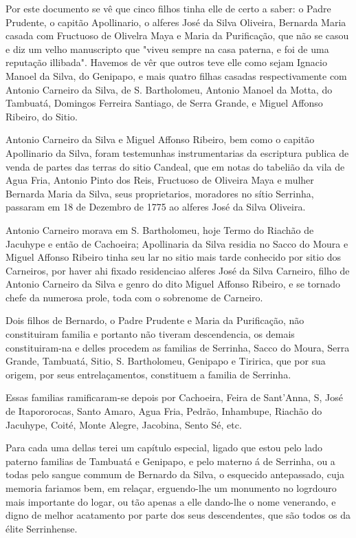 Por este documento se vê que cinco filhos tinha elle de certo a saber: o Padre Prudente, o capitão Apollinario, o alferes José da Silva Oliveira, Bernarda Maria casada com Fructuoso de Olivelra Maya e Maria da Purificação, que não se casou e diz um velho manuscripto que "viveu sempre na casa paterna, e foi de uma reputação illibada". Havemos de vêr que outros teve elle como sejam Ignacio Manoel da Silva, do Genipapo, e mais quatro filhas casadas respectivamente com Antonio Carneiro da Silva, de S. Bartholomeu, Antonio Manoel da Motta, do Tambuatá, Domingos  Ferreira Santiago, de Serra Grande, e Miguel Affonso Ribeiro, do Sitio.

Antonio Carneiro da Silva e Miguel Affonso Ribeiro, bem como o capitão Apollinario da Silva, foram testemunhas instrumentarias da escriptura publica de venda de partes das terras do sitio Candeal, que em notas do tabelião da vila de Agua Fria, Antonio Pinto dos Reis, Fructuoso de Oliveira Maya e mulher Bernarda Maria da Silva, seus proprietarios, moradores no sítio Serrinha, passaram em 18 de Dezembro de 1775 ao alferes José da Silva Oliveira.

Antonio Carneiro morava em S. Bartholomeu, hoje Termo do Riachão de Jacuhype e então de Cachoeira; Apollinaria da Silva residia no Sacco do Moura e Miguel Affonso Ribeiro tinha seu lar no sitio mais tarde conhecido por sitio dos Carneiros, por haver ahi fixado residenciao alferes José da Silva Carneiro, filho de Antonio Carneiro da Silva e genro do dito Miguel Affonso Ribeiro, e se tornado chefe da numerosa prole, toda com o sobrenome de Carneiro.

Dois filhos de Bernardo, o Padre Prudente e Maria da Purificação, não constituiram familia e portanto não tiveram descendencia, os demais constituiram-na e delles procedem as familias de Serrinha, Sacco do Moura, Serra Grande, Tambuatá, Sitio, S. Bartholomeu, Genipapo e Tiririca, que por sua origem, por seus entrelaçamentos, constituem a familia de Serrinha.

Essas familias ramificaram-se depois por Cachoeira, Feira de Sant'Anna, S, José de Itapororocas, Santo Amaro, Agua Fria, Pedrão, Inhambupe, Riachão do Jacuhype, Coité, Monte Alegre, Jacobina, Sento Sé,  etc.

Para cada uma dellas terei um capítulo especial, ligado que estou pelo lado paterno familias de Tambuatá e Genipapo, e pelo materno á de Serrinha, ou a todas pelo sangue commum de Bernardo da Silva, o esquecido antepassado, cuja memoria fariamos bem, em relaçar, erguendo-lhe um monumento no logrdouro mais importante do logar, ou tão apenas a elle dando-lhe o nome venerando, e digno de melhor acatamento por parte dos seus descendentes, que são todos os da élite Serrinhense.